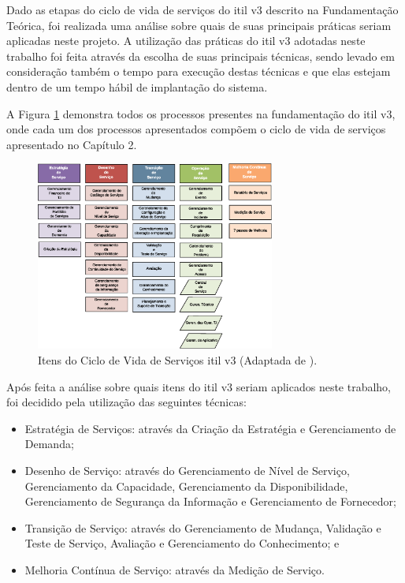 \noindent Dado as etapas do ciclo de vida de serviços do \acrshort{itil} v3 descrito na Fundamentação Teórica, foi realizada uma análise sobre quais de suas principais práticas seriam aplicadas neste projeto. A utilização das práticas do \acrshort{itil} v3 adotadas neste trabalho foi feita através da escolha de suas principais técnicas, sendo levado em consideração também o tempo para execução destas técnicas e que elas estejam dentro de um tempo hábil de implantação do sistema. 

A Figura \ref{itil_aply} demonstra todos os processos presentes na fundamentação do \acrshort{itil} v3, onde cada um dos processos apresentados compõem o ciclo de vida de serviços apresentado no Capítulo 2.

\begin{figure}[H]
  \centering
  \includegraphics[width=0.7\textwidth]{figuras/itil_aply.eps} 
  \caption{Itens do Ciclo de Vida de Serviços \acrshort{itil} v3 (Adaptada de \cite{introductoryoverviewofitil}).}
  \label{itil_aply} 
\end{figure}

Após feita a análise sobre quais itens do \acrshort{itil} v3 seriam aplicados neste trabalho, foi decidido pela utilização das seguintes técnicas:

\begin{itemize}
    \item Estratégia de Serviços: através da Criação da Estratégia e Gerenciamento de Demanda;
    \item Desenho de Serviço: através do Gerenciamento de Nível de Serviço, Gerenciamento da Capacidade, Gerenciamento da Disponibilidade, Gerenciamento de Segurança da Informação e Gerenciamento de Fornecedor;
    \item Transição de Serviço: através do Gerenciamento de Mudança, Validação e Teste de Serviço, Avaliação e Gerenciamento do Conhecimento; e
    \item Melhoria Contínua de Serviço: através da Medição de Serviço.
\end{itemize}

